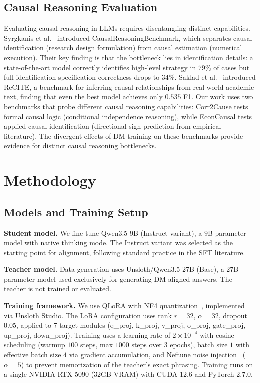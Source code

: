 \documentclass[sigconf]{acmart}
\begin{document}
\subsection{Causal Reasoning Evaluation}

Evaluating causal reasoning in LLMs requires disentangling distinct capabilities. Syrgkanis et al.~\cite{syrgkanis2026causalreasoning} introduced CausalReasoningBenchmark, which separates causal identification (research design formulation) from causal estimation (numerical execution). Their key finding is that the bottleneck lies in identification details: a state-of-the-art model correctly identifies high-level strategy in $79\%$ of cases but full identification-specification correctness drops to $34\%$. Saklad et al.~\cite{saklad2025recite} introduced ReCITE, a benchmark for inferring causal relationships from real-world academic text, finding that even the best model achieves only $0.535$ F1. Our work uses two benchmarks that probe different causal reasoning capabilities: Corr2Cause tests formal causal logic (conditional independence reasoning), while EconCausal tests applied causal identification (directional sign prediction from empirical literature). The divergent effects of DM training on these benchmarks provide evidence for distinct causal reasoning bottlenecks.

\section{Methodology}

\subsection{Models and Training Setup}

\textbf{Student model.} We fine-tune Qwen3.5-9B (Instruct variant), a $9$B-parameter model with native thinking mode. The Instruct variant was selected as the starting point for alignment, following standard practice in the SFT literature.

\textbf{Teacher model.} Data generation uses Unsloth/Qwen3.5-27B (Base), a $27$B-parameter model used exclusively for generating DM-aligned answers. The teacher is not trained or evaluated.

\textbf{Training framework.} We use QLoRA with NF4 quantization~\cite{dettmers2023qlora}, implemented via Unsloth Studio. The LoRA configuration uses rank $r\!=\!32$, $\alpha\!=\!32$, dropout $0.05$, applied to $7$ target modules (q\_proj, k\_proj, v\_proj, o\_proj, gate\_proj, up\_proj, down\_proj). Training uses a learning rate of $2\!\times\!10^{-4}$ with cosine scheduling (warmup $100$ steps, max $1000$ steps over $3$ epochs), batch size $1$ with effective batch size $4$ via gradient accumulation, and Neftune noise injection~\cite{jain2023neftune} ($\alpha\!=\!5$) to prevent memorization of the teacher's exact phrasing. Training runs on a single NVIDIA RTX 5090 (32GB VRAM) with CUDA 12.6 and PyTorch 2.7.0.
\end{document}
